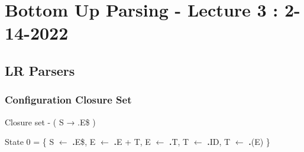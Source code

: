 \documentclass{report}
\begin{document}
\renewcommand\thechapter{3}
\chapter{Bottom Up Parsing - Lecture 3 : 2-14-2022}
\section{LR Parsers}
\subsection{Configuration Closure Set}
Closure set - ( { S → .E\$} )

State 0
 = \{ S $\leftarrow$ \textbf{.}E\$, E $\leftarrow$ \textbf{.}E + T, E $\leftarrow$ \textbf{.}T, T $\leftarrow$ \textbf{.}ID, T $\leftarrow$ \textbf{.}(E) \}
\end{document}
